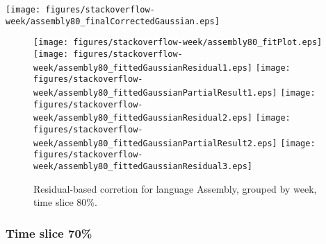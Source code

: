 \begin{center}
{\texttt{[image: figures/stackoverflow-week/assembly80\_finalCorrectedGaussian.eps]}}
\end{center}

\FloatBarrier

\begin{figure}[t]
\centering
{}
{\texttt{[image: figures/stackoverflow-week/assembly80\_fitPlot.eps]}}
{\texttt{[image: figures/stackoverflow-week/assembly80\_fittedGaussianResidual1.eps]}}
{\texttt{[image: figures/stackoverflow-week/assembly80\_fittedGaussianPartialResult1.eps]}}
{\texttt{[image: figures/stackoverflow-week/assembly80\_fittedGaussianResidual2.eps]}}
{\texttt{[image: figures/stackoverflow-week/assembly80\_fittedGaussianPartialResult2.eps]}}
{\texttt{[image: figures/stackoverflow-week/assembly80\_fittedGaussianResidual3.eps]}}
\caption{Residual-based corretion for language Assembly, grouped by week, time slice 80\%.}
\end{figure}


\FloatBarrier


\subsubsection{Time slice 70\%}

